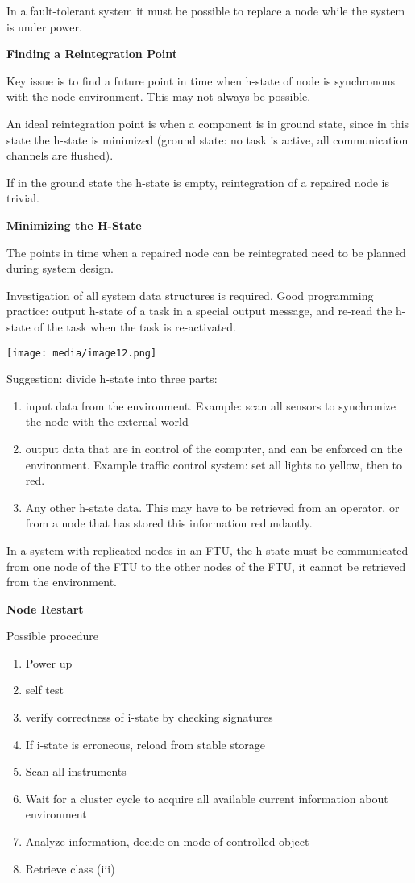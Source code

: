 In a fault-tolerant system it must be possible to replace a node while
the system is under power.

\textbf{Finding a Reintegration Point}

Key issue is to find a future point in time when h-state of node is
synchronous with the node environment. This may not always be possible.

An ideal reintegration point is when a component is in ground state,
since in this state the h-state is minimized (ground state: no task is
active, all communication channels are flushed).

If in the ground state the h-state is empty, reintegration of a repaired
node is trivial.

\textbf{Minimizing the H-State}

The points in time when a repaired node can be reintegrated need to be
planned during system design.

Investigation of all system data structures is required. Good
programming practice: output h-state of a task in a special output
message, and re-read the h-state of the task when the task is
re-activated.

\texttt{[image: media/image12.png]}

Suggestion: divide h-state into three parts:

\begin{enumerate}
\def\labelenumi{\arabic{enumi}.}
\item
  input data from the environment. Example: scan all sensors to
  synchronize the node with the external world
\item
  output data that are in control of the computer, and can be enforced
  on the environment. Example traffic control system: set all lights to
  yellow, then to red.
\item
  Any other h-state data. This may have to be retrieved from an
  operator, or from a node that has stored this information redundantly.
\end{enumerate}

In a system with replicated nodes in an FTU, the h-state must be
communicated from one node of the FTU to the other nodes of the FTU, it
cannot be retrieved from the environment.

\textbf{Node Restart}

Possible procedure

\begin{enumerate}
\def\labelenumi{\arabic{enumi}.}
\item
  Power up
\item
  self test
\item
  verify correctness of i-state by checking signatures
\item
  If i-state is erroneous, reload from stable storage
\item
  Scan all instruments
\item
  Wait for a cluster cycle to acquire all available current information
  about environment
\item
  Analyze information, decide on mode of controlled object
\item
  Retrieve class (iii)
\end{enumerate}

